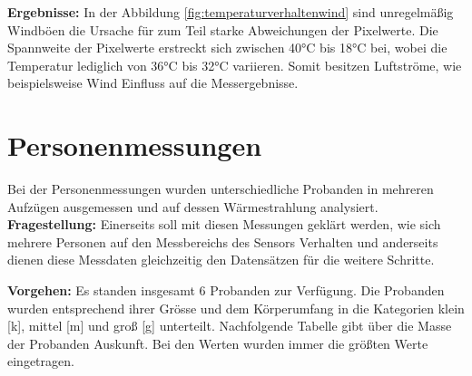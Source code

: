 \textbf{Ergebnisse:} In der Abbildung \ref{fig:temperaturverhaltenwind} sind unregelmäßig Windböen die Ursache für zum Teil starke Abweichungen der Pixelwerte. Die Spannweite der Pixelwerte erstreckt sich zwischen 40°C bis 18°C bei, wobei die Temperatur lediglich von 36°C bis 32°C variieren. Somit besitzen Luftströme, wie beispielsweise Wind Einfluss auf die Messergebnisse. 


\section{Personenmessungen}
Bei der Personenmessungen wurden unterschiedliche Probanden in mehreren Aufzügen ausgemessen und auf dessen Wärmestrahlung analysiert. \\

\textbf{Fragestellung:} Einerseits soll mit diesen Messungen geklärt werden, wie sich mehrere Personen auf den Messbereichs des Sensors Verhalten und anderseits dienen diese Messdaten gleichzeitig den Datensätzen für die weitere Schritte.

\textbf{Vorgehen:} Es standen insgesamt 6 Probanden zur Verfügung. Die Probanden wurden entsprechend ihrer Grösse und dem Körperumfang in die Kategorien klein [k], mittel [m] und groß [g] unterteilt. Nachfolgende Tabelle gibt über die Masse der Probanden Auskunft. Bei den Werten wurden immer die größten Werte eingetragen.

